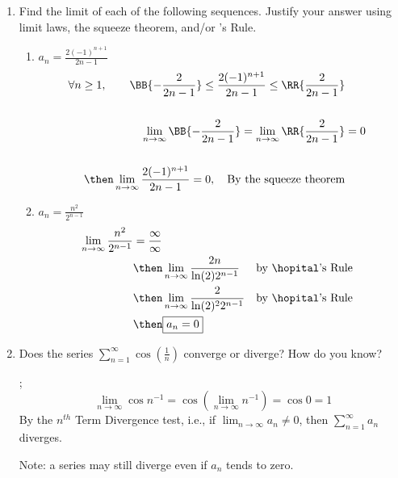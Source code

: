\documentclass{nosvagor-notes}
\begin{document}
\begin{enumerate}
  \newpage

  \item Find the limit of each of the following sequences. Justify your answer
    using limit laws, the squeeze theorem, and/or \hopital's Rule.
    \begin{enumerate}
      \item \(\displaystyle a_n = \frac{2(-1)^{n+1}}{2n-1}\)
      \begin{align*}
        \forall n \geq 1,
        \qquad \BB{-\frac{2}{2n-1}} \leq
        \frac{2(-1)^{n+1}}{2n-1} \leq
        \RR{\frac{2}{2n-1}} \\\\
        \lim_{n \to \infty} \BB{-\frac{2}{2n-1}} =
        \lim_{n \to \infty} \RR{\frac{2}{2n-1}} &= 0 \\\\
        \then \lim_{n \to \infty} \frac{2(-1)^{n+1}}{2n-1} = 0, \quad \text{By the squeeze theorem} \\
      \end{align*}

    \vspace{90pt}
      \item \(\displaystyle a_n = \frac{n^2}{2^{n-1}}\)
        \begin{align*}
          \lim_{n \to \infty} \frac{n^2}{2^{n-1}} &= \frac{\infty}{\infty} \\
          &\then \lim_{n \to \infty} \frac{2n}{\ln(2)2^{n-1}}
          && \text{by \hopital's Rule} \\
          &\then \lim_{n \to \infty} \frac{2}{\ln(2)^2 2^{n-1}}
          && \text{by \hopital's Rule} \\
          &\then \boxed{a_n = 0}
        \end{align*}
    \end{enumerate}

  \newpage

  \item Does the series \(\displaystyle \sum_{n=1}^{\infty} \cos \left(
    \frac{1}{n} \right) \) converge or diverge? How do you know?

    ;
    \[%
      \lim_{n \to \infty} \cos n^{-1} = \cos \left(\lim_{n \to \infty} n^{-1}\right) = \cos 0 = 1
    \]%
    By the \(n^{th}\) Term Divergence test, i.e., if \(\lim_{n \to \infty} a_n
    \neq 0\), then \(\sum_{n=1}^{\infty} a_n\) diverges.

    Note: a series may still diverge even if \(a_n\) tends to zero.
    \vspace{80pt}


\end{enumerate}
\end{document}
